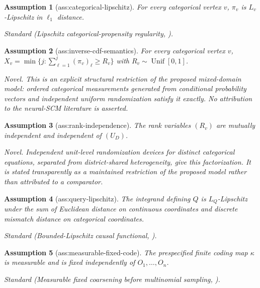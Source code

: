 \documentclass{article}
\newtheorem{assumption}{Assumption}
\begin{document}
\begin{assumption}[ass:categorical-lipschitz]\label{ass:categorical-lipschitz}
For every categorical vertex \(v\), \(\pi_v\) is \(L_v\)-Lipschitz in \(\ell_1\) distance.
\par\smallskip\noindent\emph{Standard} (Lipschitz categorical-propensity regularity, \cite{TanBlanchetSyrgkanis2024}).
\end{assumption}

\begin{assumption}[ass:inverse-cdf-semantics]\label{ass:inverse-cdf-semantics}
For every categorical vertex \(v\), \(X_v=\min\{j:\sum_{\ell=1}^j(\pi_v)_\ell\ge R_v\}\) with \(R_v\sim\operatorname{Unif}[0,1]\).
\par\smallskip\noindent\emph{Novel.} This is an explicit structural restriction of the proposed mixed-domain model: ordered categorical measurements generated from conditional probability vectors and independent uniform randomization satisfy it exactly. No attribution to the neural-SCM literature is asserted.
\end{assumption}

\begin{assumption}[ass:rank-independence]\label{ass:rank-independence}
The rank variables \((R_v)\) are mutually independent and independent of \((U_D)\).
\par\smallskip\noindent\emph{Novel.} Independent unit-level randomization devices for distinct categorical equations, separated from district-shared heterogeneity, give this factorization. It is stated transparently as a maintained restriction of the proposed model rather than attributed to a comparator.
\end{assumption}

\begin{assumption}[ass:query-lipschitz]\label{ass:query-lipschitz}
The integrand defining \(Q\) is \(L_Q\)-Lipschitz under the sum of Euclidean distance on continuous coordinates and discrete mismatch distance on categorical coordinates.
\par\smallskip\noindent\emph{Standard} (Bounded-Lipschitz causal functional, \cite{TanBlanchetSyrgkanis2024}).
\end{assumption}

\begin{assumption}[ass:measurable-fixed-code]\label{ass:measurable-fixed-code}
The prespecified finite coding map \(\kappa\) is measurable and is fixed independently of \(O_1,\ldots,O_n\).
\par\smallskip\noindent\emph{Standard} (Measurable fixed coarsening before multinomial sampling, \cite{ChafaiConcordet2009}).
\end{assumption}
\end{document}
